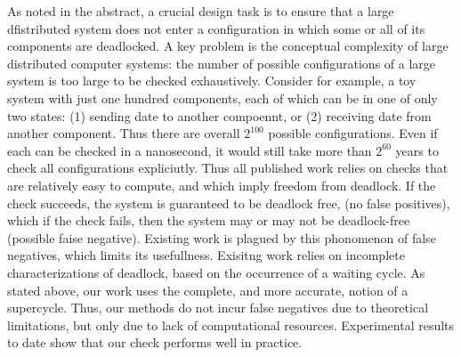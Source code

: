 As noted in the abstract, a crucial design task is to ensure that a large dfistributed system does not enter a configuration in which some or all of
its components are deadlocked. 
A key problem is the conceptual complexity of large distributed computer systems: the number of possible configurations of a large system is 
too large to be checked exhaustively. Consider for example, a toy system with just one hundred components, each of which can be in
one of only two states: (1) sending date to another compoennt, or (2) receiving date from another component. Thus there are overall $2^{100}$ possible
configurations. Even if each can be checked in a nanosecond, it would still take more than $2^{60}$ years to check all configurations expliciutly.
%
Thus all published work relies on checks that are 
relatively easy to compute, and which imply freedom from deadlock. If the check succeeds, the system is guaranteed to be deadlock free, (no false
positives), which if the check fails, then the system may or may not be deadlock-free (possible faise negative).  Existing work is plagued by this
phonomenon of false negatives, which limits its usefullness.
%
Exisitng work relies on incomplete characterizations of deadlock, based on the occurrence of a waiting cycle. 
As stated above, our work uses the complete, and more accurate, notion of a supercycle. Thus, our methods do not incur false negatives due to 
theoretical limitations, but only due to lack of computational resources. Experimental results to date show that our check performs well in practice.



%







